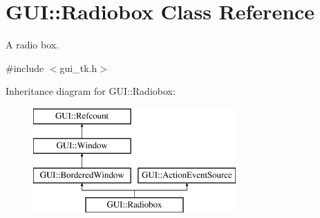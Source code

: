 \hypertarget{classGUI_1_1Radiobox}{\section{G\-U\-I\-:\-:Radiobox Class Reference}
\label{classGUI_1_1Radiobox}
}


A radio box.  




{\ttfamily \#include $<$gui\-\_\-tk.\-h$>$}

Inheritance diagram for G\-U\-I\-:\-:Radiobox\-:\begin{figure}[H]
\begin{center}
\leavevmode
\includegraphics[height=4.000000cm]{classGUI_1_1Radiobox}
\end{center}
\end{figure}

